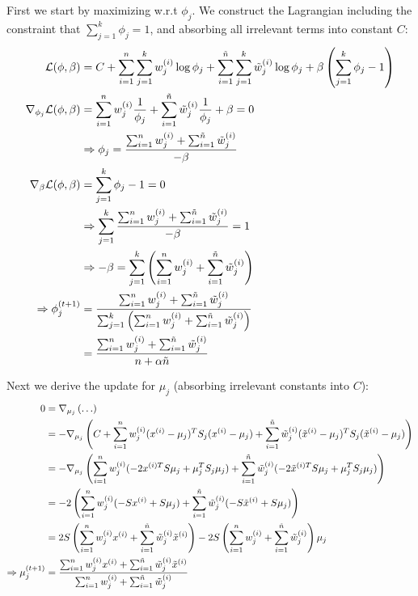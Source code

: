 \begin{answer}
First we start by maximizing w.r.t $\phi_j$. We construct the Lagrangian including the constraint that $\sum_{j=1}^k \phi_j = 1$, and absorbing all irrelevant terms into constant $C$:
\begin{align*}
\mathcal{L}(\phi, \beta) &= C + \sum_{i=1}^{n}\sum_{j=1}^k w^{(i)}_j \log \phi_j + \sum_{i=1}^{\tilde{{n}}}\sum_{j=1}^k \tilde{w}^{(i)}_j \log \phi_j + \beta\left(\sum_{j=1}^k \phi_j - 1\right) \\
\nabla_{\phi_j}\mathcal{L}(\phi, \beta) &=  \sum_{i=1}^{n} w^{(i)}_j\frac{1}{\phi_j} + \sum_{i=1}^{\tilde{{n}}} \tilde{w}^{(i)}_j\frac{1}{\phi_j} + \beta = 0 \\
&\Rightarrow \phi_j = \frac{\sum_{i=1}^{n} w^{(i)}_j + \sum_{i=1}^{\tilde{{n}}} \tilde{w}^{(i)}_j}{-\beta} \\
\nabla_\beta\mathcal{L}(\phi,\beta) &= \sum_{j=1}^k \phi_j -1 = 0 \\
&\Rightarrow \sum_{j=1}^k \frac{\sum_{i=1}^{n} w^{(i)}_j + \sum_{i=1}^{\tilde{{n}}} \tilde{w}^{(i)}_j}{-\beta} = 1 \\
&\Rightarrow -\beta = \sum_{j=1}^k \left(\sum_{i=1}^{n} w^{(i)}_j + \sum_{i=1}^{\tilde{{n}}} \tilde{w}^{(i)}_j\right)  \\
\Rightarrow \phi_j^{(t+1)} &= \frac{ \sum_{i=1}^{n} w_j^{(i)} + \sum_{i=1}^{\tilde{{n}}}\tilde{w}_j^{(i)}} { \sum_{j=1}^k \left(\sum_{i=1}^{n} w^{(i)}_j + \sum_{i=1}^{\tilde{{n}}} \tilde{w}^{(i)}_j\right) } \\
&= \frac{ \sum_{i=1}^{n} w_j^{(i)} + \sum_{i=1}^{\tilde{{n}}}\tilde{w}_j^{(i)}} { {n} + \alpha \tilde{{n}}}
\end{align*}

Next we derive the update for $\mu_j$ (absorbing irrelevant constants into $C$):
\begin{align*}
0 &= \nabla_{\mu_j} \left(\ldots\right) \\
&= -\nabla_{\mu_j} \left( C + \sum_{i=1}^{n} w^{(i)}_j (x^{(i)}-\mu_j)^TS_j(x^{(i)}-\mu_j) + \sum_{i=1}^{\tilde{{n}}} \tilde{w}^{(i)}_j (\tilde{x}^{(i)}-\mu_j)^TS_j(\tilde{x}^{(i)}-\mu_j)\right) \\
&= -\nabla_{\mu_j} \left(\sum_{i=1}^{n} w^{(i)}_j (-2x^{(i)T} S\mu_j + \mu_j^TS_j\mu_j) + \sum_{i=1}^{\tilde{{n}}} \tilde{w}^{(i)}_j (-2\tilde{x}^{(i)T}S\mu_j + \mu_j^TS_j\mu_j) \right) \\
&= - 2\left(\sum_{i=1}^{n} w^{(i)}_j (-Sx^{(i)} + S\mu_j) + \sum_{i=1}^{\tilde{{n}}} \tilde{w}^{(i)}_j (-S\tilde{x}^{(i)} + S\mu_j) \right) \\
&= 2S\left(\sum_{i=1}^{n} w^{(i)}_jx^{(i)} + \sum_{i=1}^{\tilde{{n}}}\tilde{w}^{(i)}_j \tilde{x}^{(i)}\right) -2S\left(\sum_{i=1}^{n} w^{(i)}_j + \sum_{i=1}^{\tilde{{n}}} \tilde{w}^{(i)}_j \right)\mu_j \\
\Rightarrow \mu_j^{(t+1)} &= \frac{\sum_{i=1}^{n} w_j^{(i)}x^{(i)} + \sum_{i=1}^{\tilde{{n}}}\tilde{w}^{(i)}_j \tilde{x}^{(i)}   }{ \sum_{i=1}^{n} w_j^{(i)} + \sum_{i=1}^{\tilde{{n}}}\tilde{w}^{(i)}_j }
\end{align*}


\end{answer}
